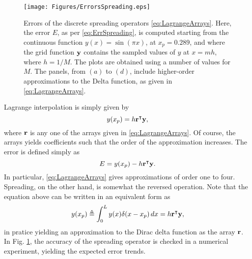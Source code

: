 \documentclass[11pt,twoside,a4paper,english]{book}
\begin{document}
\begin{figure}[hbt]
\centering
\texttt{[image: Figures/ErrorsSpreading.eps]}
\caption{Errors of the discrete spreading operators \eqref{eq:LagrangeArrays}. Here, the error $E$, as per \eqref{eq:ErrSpreading}, is computed starting from the continuous function $y(x) = \sin (\pi x)$, at $x_p=0.289$, and where the grid function ${\bf y}$ contains the sampled values of $y$ at $x=mh$, where $h=1/M$. The plots are obtained using a number of values for $M$. The panels, from $(a)$ to $(d)$, include higher-order approximations to the Delta function, as given in \eqref{eq:LagrangeArrays}.}\label{fig:ErrsLagrange}
\end{figure}
Lagrange interpolation is simply given by
\begin{equation}
y(x_p) = h{\bf r}^\intercal {\bf y},
\end{equation}
where $\bf r$ is any one of the arrays given in \eqref{eq:LagrangeArrays}. Of course, the arrays yields coefficients such that the order of the approximation increases. The error is defined simply as
\begin{equation}\label{eq:ErrSpreading}
E = y(x_p)-h{\bf r}^\intercal {\bf y}.
\end{equation}
In particular, \eqref{eq:LagrangeArrays} gives approximations of order one to four. Spreading, on the other hand, is somewhat the reversed operation. Note that the equation above can be written in an equivalent form as
\begin{equation}
y(x_p) \triangleq \int_0^L y(x) \delta(x-x_p)\, dx = h{\bf r}^\intercal {\bf y},
\end{equation}
in pratice yielding an approximation to the Dirac delta function as the array $\bf r$. In Fig. \ref{fig:ErrsLagrange}, the accuracy of the spreading operator is checked in a numerical experiment, yielding the expected error trends. 
\end{document}
